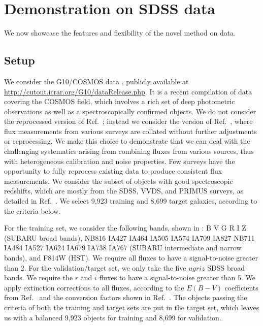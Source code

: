 \documentclass[aps,prd,showpacs,superscriptaddress,groupedaddress]{revtex4}  %
\begin{document}
\section{Demonstration on SDSS data}\label{sec:data}

We now showcase the features and flexibility of the novel method on data. 

\subsection{Setup}

We consider the G10/COSMOS data \citep{Davies:2015}, publicly available at \url{http://cutout.icrar.org/G10/dataRelease.php}. 
It is a recent compilation of data covering the COSMOS field, which involves a rich set of deep photometric observations as well as a spectroscopically confirmed objects.
We do not consider the reprocessed version of Ref.~\citep{Andrews:2016}; instead we consider the version of Ref.~\citep{Davies:2015}, where flux measurements from various surveys are collated without further adjustments or reprocessing.
We make this choice to demonstrate that we can deal with the challenging systematics arising from combining fluxes from various sources, thus with heterogeneous calibration and noise properties.
Few surveys have the opportunity to fully reprocess existing data to produce consistent flux measurements.  
We consider the subset of objects with good spectroscopic redshifts, which are mostly from the SDSS, VVDS, and PRIMUS surveys, as detailed in Ref.~\citep{Davies:2015}.
We select 9,923 training and 8,699 target galaxies, according to the criteria below.

For the training set, we consider the following bands, shown in : B V G R I Z (SUBARU broad bands), NB816 IA427 IA464 IA505 IA574 IA709 IA827 NB711 IA484 IA527 IA624 IA679 IA738 IA767  (SUBARU intermediate and narrow bands), and F814W (HST). 
We require all fluxes to have a signal-to-noise greater than 2. 
For the validation/target set, we only take the five $ugriz$ SDSS broad bands.
We require the $r$ and $i$ fluxes to have a signal-to-noise greater than 5.
We apply extinction corrections to all fluxes, according to the $E(B-V)$ coefficients from Ref.~\citep{Schlegel:1998} and the conversion factors shown in Ref.~\citep{Andrews:2016}.
The objects passing the criteria of both the training and target sets are put in the target set, which leaves us with a balanced 9,923 objects for training and 8,699 for validation.
\end{document}

